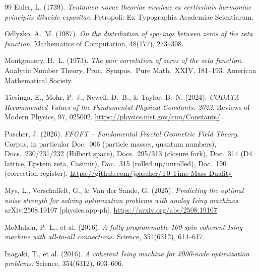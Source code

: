\begin{thebibliography}{99}
Euler, L. (1739).
\textit{Tentamen novae theoriae musicae ex certissimis harmoniae
principiis dilucide expositae}.
Petropoli: Ex Typographia Academiae Scientiarum.

Odlyzko, A.~M. (1987).
\textit{On the distribution of spacings between zeros of the zeta
function}.
Mathematics of Computation, 48(177), 273--308.

Montgomery, H.~L. (1973).
\textit{The pair correlation of zeros of the zeta function}.
Analytic Number Theory, Proc.\ Sympos.\ Pure Math.\ XXIV, 181--193.
American Mathematical Society.

Tiesinga, E., Mohr, P.~J., Newell, D.~B., \& Taylor, B.~N. (2024).
\textit{CODATA Recommended Values of the Fundamental Physical
Constants: 2022}.
Reviews of Modern Physics, 97, 025002.
\url{https://physics.nist.gov/cuu/Constants/}

Pascher, J. (2026).
\textit{FFGFT -- Fundamental Fractal Geometric Field Theory}.
Corpus, in particular Doc.~006 (particle masses, quantum numbers),
Docs.~230/231/232 (Hilbert space), Docs.~295/313
(closure fork), Doc.~314 (D4 lattice, Epstein zeta, Casimir),
Doc.~315 (rolled up/unrolled), Doc.~190 (correction register).
\url{https://github.com/jpascher/T0-Time-Mass-Duality}

Mys, L., Verschaffelt, G., \& Van der Sande, G. (2025).
\textit{Predicting the optimal noise strength for solving optimization
problems with analog Ising machines}.
arXiv:2508.19107 [physics.app-ph].
\url{https://arxiv.org/abs/2508.19107}

McMahon, P.~L., et al. (2016).
\textit{A fully programmable 100-spin coherent Ising machine with all-to-all
connections}.
Science, 354(6312), 614--617.

Inagaki, T., et al. (2016).
\textit{A coherent Ising machine for 2000-node optimization problems}.
Science, 354(6312), 603--606.

\end{thebibliography}
